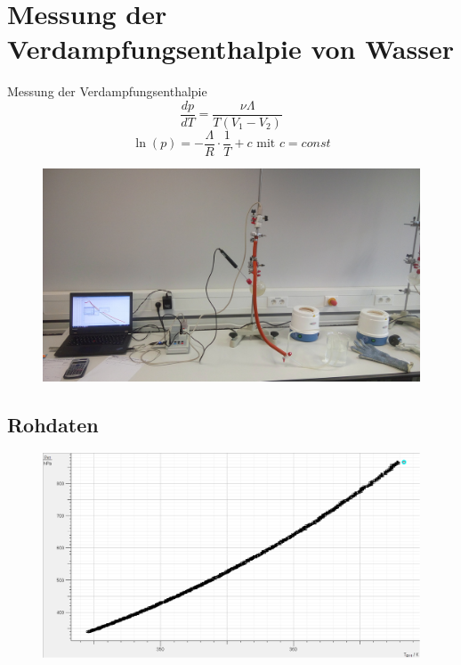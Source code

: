 \documentclass[11pt]{beamer}
\begin{document}
\section{Messung der Verdampfungsenthalpie von Wasser}
\begin{frame}{Messung der Verdampfungsenthalpie}
\begin{equation*}
\frac{dp}{dT}=\frac{\nu \Lambda}{T(V_1-V_2)}
\end{equation*}
\begin{equation*}
\ln(p)=-\frac{\Lambda}{R}\cdot \frac{1}{T}+c \text{ mit } c=const
\end{equation*}
\end{frame}


\begin{frame}
\begin{figure}[H]
\centering
\includegraphics[scale=0.065]{Bilder/IMG_20160331_121650.jpg}
\end{figure}
\end{frame}

\subsection{Rohdaten}
\begin{frame}
\begin{figure}[H]
\centering
\includegraphics[scale=0.4]{Bilder/RohdatenHaupmessungGrp11.png}
\end{figure}
\end{frame}
\end{document}
